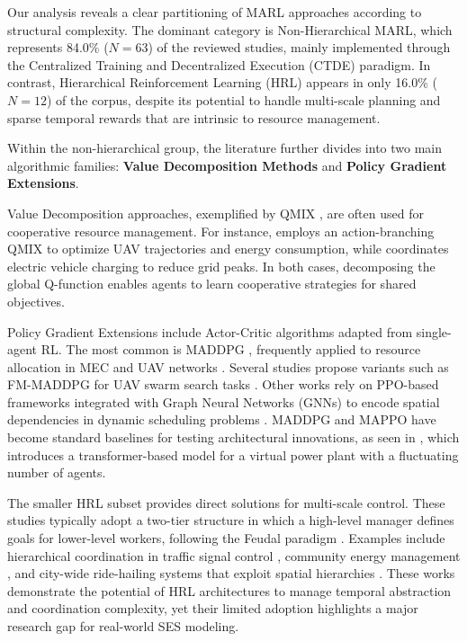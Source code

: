 \documentclass[conference]{IEEEtran}
\begin{document}
Our analysis reveals a clear partitioning of MARL approaches according to structural complexity. The dominant category is Non-Hierarchical MARL, which represents 84.0\% ($N=63$) of the reviewed studies, mainly implemented through the Centralized Training and Decentralized Execution (CTDE) paradigm. In contrast, Hierarchical Reinforcement Learning (HRL) appears in only 16.0\% ($N=12$) of the corpus, despite its potential to handle multi-scale planning and sparse temporal rewards that are intrinsic to resource management.

Within the non-hierarchical group, the literature further divides into two main algorithmic families: \textbf{Value Decomposition Methods} and \textbf{Policy Gradient Extensions}.

Value Decomposition approaches, exemplified by QMIX \cite{rashidQMIXMonotonicValue2018a}, are often used for cooperative resource management. For instance, \cite{rayyan-353821111} employs an action-branching QMIX to optimize UAV trajectories and energy consumption, while \cite{rayyan-353822176} coordinates electric vehicle charging to reduce grid peaks. In both cases, decomposing the global Q-function enables agents to learn cooperative strategies for shared objectives.

Policy Gradient Extensions include Actor-Critic algorithms adapted from single-agent RL. The most common is MADDPG \cite{loweMultiAgentActorCriticMixed2020}, frequently applied to resource allocation in MEC and UAV networks \cite{rayyan-353821831}. Several studies propose variants such as FM-MADDPG for UAV swarm search tasks \cite{rayyan-353820459}. Other works rely on PPO-based frameworks integrated with Graph Neural Networks (GNNs) to encode spatial dependencies in dynamic scheduling problems \cite{rayyan-353821868}. MADDPG and MAPPO \cite{yuSurprisingEffectivenessPPO2022} have become standard baselines for testing architectural innovations, as seen in \cite{rayyan-353822239}, which introduces a transformer-based model for a virtual power plant with a fluctuating number of agents.

The smaller HRL subset provides direct solutions for multi-scale control. These studies typically adopt a two-tier structure in which a high-level manager defines goals for lower-level workers, following the Feudal paradigm \cite{dayanFeudalReinforcementLearning1992}. Examples include hierarchical coordination in traffic signal control \cite{rayyan-353822005}, community energy management \cite{rayyan-353822026}, and city-wide ride-hailing systems that exploit spatial hierarchies \cite{rayyan-353821405}. These works demonstrate the potential of HRL architectures to manage temporal abstraction and coordination complexity, yet their limited adoption highlights a major research gap for real-world SES modeling.
\end{document}
